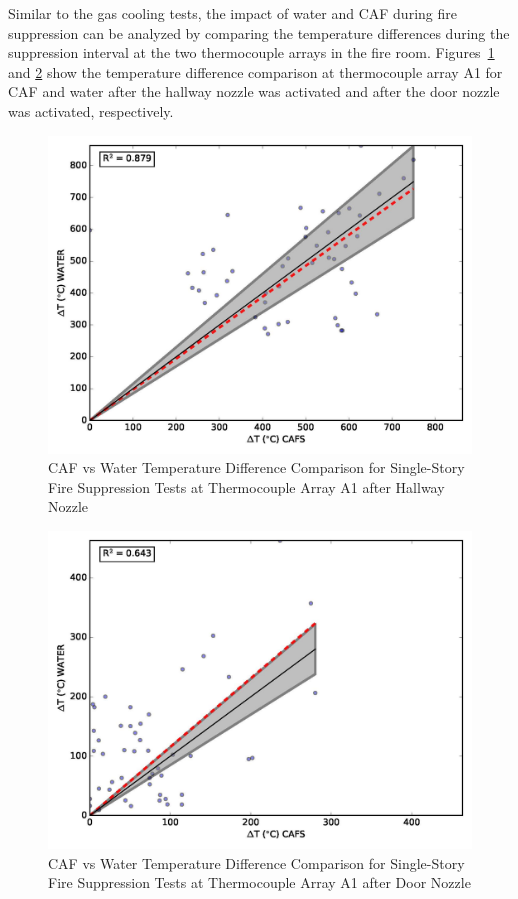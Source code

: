 \documentclass[12pt,oneside]{book}
\begin{document}
Similar to the gas cooling tests, the impact of water and CAF during fire suppression can be analyzed by comparing the temperature differences during the suppression interval at the two thermocouple arrays in the fire room. Figures~\ref{fig:fs_hall_a1} and \ref{fig:fs_door_a1} show the temperature difference comparison at thermocouple array A1 for CAF and water after the hallway nozzle was activated and after the door nozzle was activated, respectively. 

\begin{figure}[!ht]
	\includegraphics[width=.7\columnwidth]{../Figures/Script_Figures/TCA1_hallnozzle_scatter}
	\caption{CAF vs Water Temperature Difference Comparison for Single-Story Fire Suppression Tests at Thermocouple Array A1 after Hallway Nozzle}
	\label{fig:fs_hall_a1}
\end{figure}

\begin{figure}[!ht]
	\includegraphics[width=.7\columnwidth]{../Figures/Script_Figures/TCA1_doornozzle_scatter}
	\caption{CAF vs Water Temperature Difference Comparison for Single-Story Fire Suppression Tests at Thermocouple Array A1 after Door Nozzle}
	\label{fig:fs_door_a1}
\end{figure}
\end{document}
